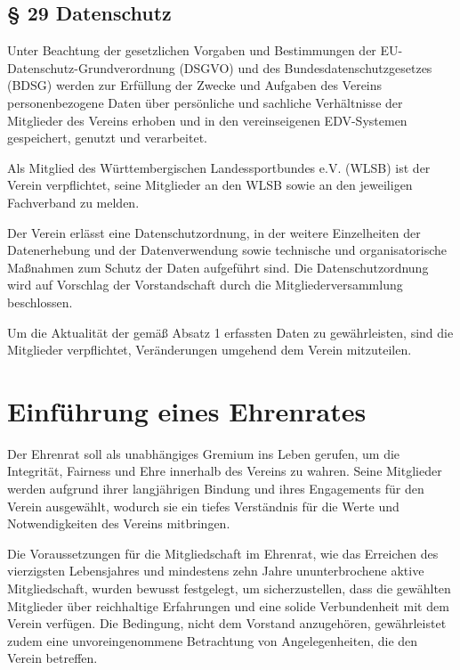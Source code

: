 \documentclass[10pt,a4paper,parskip=half]{scrartcl}
\newcommand{\change}[1]{
  \begin{adjustwidth}{20pt}{20pt}
    #1
  \end{adjustwidth}
}
\begin{document}
  \change{
    \subsection*{§ 29 Datenschutz}

    Unter Beachtung der gesetzlichen Vorgaben und Bestimmungen der EU\--Daten\-schutz\--Grund\-verordnung (DSGVO) und des Bundes\-datenschutz\-gesetzes (BDSG) werden zur Erfüllung der Zwecke und Aufgaben des Vereins personenbezogene Daten über persönliche und sachliche Verhältnisse der Mitglieder des Vereins erhoben und in den vereinseigenen EDV-Systemen gespeichert, genutzt und verarbeitet.

    Als Mitglied des Württembergischen Landessportbundes e.V. (WLSB) ist der Verein verpflichtet, seine Mitglieder an den WLSB sowie an den jeweiligen Fachverband zu melden.
    
    Der Verein erlässt eine Datenschutzordnung, in der weitere Einzelheiten der Datenerhebung und der Datenverwendung sowie technische und organisatorische Maßnahmen zum Schutz der Daten aufgeführt sind. Die Datenschutzordnung wird auf Vorschlag der Vorstandschaft durch die Mitgliederversammlung beschlossen.
    
    Um die Aktualität der gemäß Absatz 1 erfassten Daten zu gewährleisten,
    sind die Mitglieder verpflichtet, Veränderungen umgehend dem Verein mitzuteilen.
  }
  \clearpage

  \section{Einführung eines Ehrenrates}
  Der Ehrenrat soll als unabhängiges Gremium ins Leben gerufen, um die Integrität, Fairness und Ehre innerhalb des Vereins zu wahren. Seine Mitglieder werden aufgrund ihrer langjährigen Bindung und ihres Engagements für den Verein ausgewählt, wodurch sie ein tiefes Verständnis für die Werte und Notwendigkeiten des Vereins mitbringen.

  Die Voraussetzungen für die Mitgliedschaft im Ehrenrat, wie das Erreichen des vierzigsten Lebensjahres und mindestens zehn Jahre ununterbrochene aktive Mitgliedschaft, wurden bewusst festgelegt, um sicherzustellen, dass die gewählten Mitglieder über reichhaltige Erfahrungen und eine solide Verbundenheit mit dem Verein verfügen. Die Bedingung, nicht dem Vorstand anzugehören, gewährleistet zudem eine unvoreingenommene Betrachtung von Angelegenheiten, die den Verein betreffen.
\end{document}
